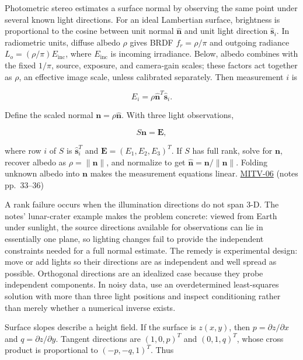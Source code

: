 \hypertarget{04-visual-computing-ii-ch032-recovering-surface-orientation-from-controlled-illumination}{}

Photometric stereo estimates a surface normal by observing the same point under several known light directions. For an ideal Lambertian surface, brightness is proportional to the cosine between unit normal \(\hat{\mathbf{n}}\) and unit light direction \(\hat{\mathbf{s}}_i\). In radiometric units, diffuse albedo \(\rho\) gives BRDF \(f_r=\rho/\pi\) and outgoing radiance \(L_o=(\rho/\pi)E_{\mathrm{inc}}\), where \(E_{\mathrm{inc}}\) is incoming irradiance. Below, albedo combines with the fixed \(1/\pi\), source, exposure, and camera-gain scales; these factors act together as \(\rho\), an effective image scale, unless calibrated separately. Then measurement \(i\) is

\[
E_i=\rho\hat{\mathbf{n}}^T\hat{\mathbf{s}}_i.
\]

Define the scaled normal \(\mathbf{n}=\rho\hat{\mathbf{n}}\). With three light observations,

\[
S\mathbf{n}=\mathbf{E},
\]

where row \(i\) of \(S\) is \(\hat{\mathbf{s}}_i^T\) and \(\mathbf{E}=(E_1,E_2,E_3)^T\). If \(S\) has full rank, solve for \(\mathbf{n}\), recover albedo as \(\rho=\|\mathbf{n}\|\), and normalize to get \(\hat{\mathbf{n}}=\mathbf{n}/\|\mathbf{n}\|\). Folding unknown albedo into \(\mathbf{n}\) makes the measurement equations linear. \hyperref[04-visual-computing-ii-ch036-mitv-06---photometric-stereo-noise-gain-error-amplification-eigenvalues-and-eigenvectors-review]{MITV-06} (notes pp.~33--36)

A rank failure occurs when the illumination directions do not span 3-D. The notes' lunar-crater example makes the problem concrete: viewed from Earth under sunlight, the source directions available for observations can lie in essentially one plane, so lighting changes fail to provide the independent constraints needed for a full normal estimate. The remedy is experimental design: move or add lights so their directions are as independent and well spread as possible. Orthogonal directions are an idealized case because they probe independent components. In noisy data, use an overdetermined least-squares solution with more than three light positions and inspect conditioning rather than merely whether a numerical inverse exists.

Surface slopes describe a height field. If the surface is \(z(x,y)\), then \(p=\partial z/\partial x\) and \(q=\partial z/\partial y\). Tangent directions are \((1,0,p)^T\) and \((0,1,q)^T\), whose cross product is proportional to \((-p,-q,1)^T\). Thus

